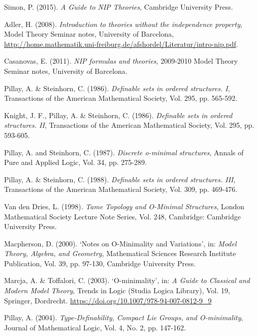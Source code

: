 \documentclass[a4paper]{report}
\theoremstyle{definition}
\theoremstyle{remstyle}
\begin{document}
\begin{thebibliography}{100}

	 Simon, P. (2015). \emph{A Guide to NIP Theories}, Cambridge University Press.

	 Adler, H. (2008). \emph{Introduction to theories without the independence property}, Model Theory Seminar notes, University of Barcelona, \url{http://home.mathematik.uni-freiburg.de/afshordel/Literatur/intro-nip.pdf}.

	 Casanovas, E. (2011). \emph{NIP formulas and theories}, 2009-2010 Model Theory Seminar notes, University of Barcelona.

	 Pillay, A. \& Steinhorn, C. (1986). \emph{Definable sets in ordered structures. I}, Transactions of the American Mathematical Society, Vol. 295, pp. 565-592.

	 Knight, J. F., Pillay, A. \& Steinhorn, C. (1986). \emph{Definable sets in ordered structures. II}, Transactions of the American Mathematical Society, Vol. 295, pp. 593-605.

	 Pillay, A. and Steinhorn, C. (1987). \emph{Discrete o-minimal structures}, Annals of Pure and Applied Logic, Vol. 34, pp. 275-289.

	 Pillay, A. \& Steinhorn, C. (1988). \emph{Definable sets in ordered structures. III}, Transactions of the American Mathematical Society, Vol. 309, pp. 469-476.

	 Van den Dries, L. (1998). \emph{Tame Topology and O-Minimal Structures}, London Mathematical Society Lecture Note Series, Vol. 248, Cambridge: Cambridge University Press.

	 Macpherson, D. (2000). `Notes on O-Minimality and Variations', in: \emph{Model Theory, Algebra, and Geometry}, Mathematical Sciences Research Institute Publication, Vol. 39, pp. 97-130, Cambridge University Press.

	 Marcja, A. \& Toffalori, C. (2003). `O-minimality', in: \emph{A Guide to Classical and Modern Model Theory}, Trends in Logic (Studia Logica Library), Vol. 19, Springer, Dordrecht. \url{https://doi.org/10.1007/978-94-007-0812-9_9}

	 Pillay, A. (2004). \emph{Type-Definability, Compact Lie Groups, and O-minimality}, Journal of Mathematical Logic, Vol. 4, No. 2, pp. 147-162.


\end{thebibliography}
\end{document}
